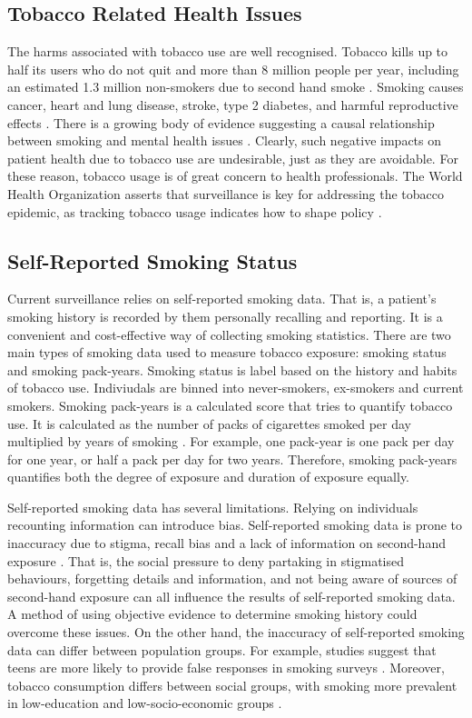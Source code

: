 \documentclass{article}
\begin{document}
\subsection{Tobacco Related Health Issues}
The harms associated with tobacco use are well recognised. Tobacco kills up to half its users who do not quit and more than 8 million people per year, including an estimated 1.3 million non-smokers due to second hand smoke \cite{who_tobacco}. Smoking causes cancer, heart and lung disease, stroke, type 2 diabetes, and harmful reproductive effects \cite{hhs_smoking_2014}. There is a growing body of evidence suggesting a causal relationship between smoking and mental health issues \cite{taylor2019smoking}. Clearly, such negative impacts on patient health due to tobacco use are undesirable, just as they are avoidable. For these reason, tobacco usage is of great concern to health professionals. The World Health Organization asserts that surveillance is key for addressing the tobacco epidemic, as tracking tobacco usage indicates how to shape policy \cite{who_tobacco}.

\subsection{Self-Reported Smoking Status}
Current surveillance relies on self-reported smoking data. That is, a patient's smoking history is recorded by them personally recalling and reporting. It is a convenient and cost-effective way of collecting smoking statistics. There are two main types of smoking data used to measure tobacco exposure: smoking status and smoking pack-years. Smoking status is label based on the history and habits of tobacco use. Indiviudals are binned into never-smokers, ex-smokers and current smokers. Smoking pack-years is a calculated score that tries to quantify tobacco use. It is calculated as the number of packs of cigarettes smoked per day multiplied by years of smoking \cite{NCI_pack_year}. For example, one pack-year is one pack per day for one year, or half a pack per day for two years. Therefore, smoking pack-years quantifies both the degree of exposure and duration of exposure equally.

Self-reported smoking data has several limitations. Relying on individuals recounting information can introduce bias. Self-reported smoking data is prone to inaccuracy due to stigma, recall bias and a lack of information on second-hand exposure \cite{park2015correlation, gorber2009accuracy}. That is, the social pressure to deny partaking in stigmatised behaviours, forgetting details and information, and not being aware of sources of second-hand exposure can all influence the results of self-reported smoking data. A method of using objective evidence to determine smoking history could overcome these issues. On the other hand, the inaccuracy of self-reported smoking data can differ between population groups. For example, studies suggest that teens are more likely to provide false responses in smoking surveys \cite{park2015correlation}. Moreover, tobacco consumption differs between social groups, with smoking more prevalent in low-education and low-socio-economic groups \cite{cdc2019_smoking}.
\end{document}

